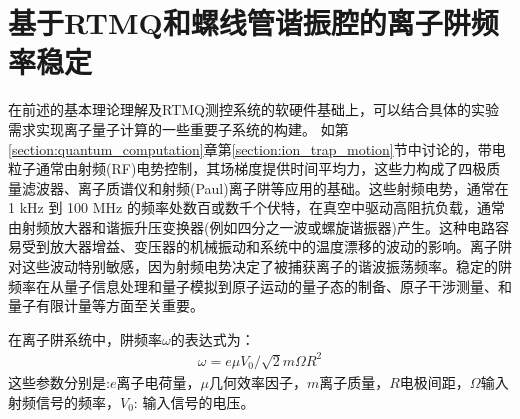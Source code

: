 \section[基于RTMQ和螺线管谐振腔的离子阱频率稳定]{基于RTMQ和螺线管谐振腔的离子阱频率稳定\label{section:trap_frequency_stablization}}

在前述的基本理论理解及RTMQ测控系统的软硬件基础上，可以结合具体的实验需求实现离子量子计算的一些重要子系统的构建。
如第\ref{section:quantum_computation}章第\ref{section:ion_trap_motion}节中讨论的，带电粒子通常由射频(RF)电势控制，其场梯度提供时间平均力，这些力构成了四极质量滤波器、离子质谱仪和射频(Paul)离子阱等应用的基础\cite[]{Dehmelt_1990, Paul_1990}。这些射频电势，通常在 1 kHz 到 100 MHz 的频率处数百或数千个伏特，在真空中驱动高阻抗负载，通常由射频放大器和谐振升压变换器(例如四分之一波或螺旋谐振器)产生\cite[]{Siverns_Simkins_Weidt_Hensinger_2012}。这种电路容易受到放大器增益、变压器的机械振动和系统中的温度漂移的波动的影响。离子阱对这些波动特别敏感，因为射频电势决定了被捕获离子的谐波振荡频率。稳定的阱频率在从量子信息处理\cite[]{Blatt_Wineland_2008, Monroe_Kim_2013}和量子模拟\cite[]{Richerme_Gong_Lee_Senko_Smith_Foss_Feig_Michalakis_Gorshkov_Monroe_2014, Jurcevic_Lanyon_Hauke_Hempel_Zoller_Blatt_Roos_2014}到原子运动的量子态的制备\cite[]{Leibfried_Blatt_Monroe_Wineland_2003}、原子干涉测量\cite[]{Johnson_Neyenhuis_Mizrahi_Wong_Campos_Monroe_2015}、和量子有限计量\cite[]{Chou_Hume_Koelemeij_Wineland_Rosenband_2010}等方面至关重要。


在离子阱系统中，阱频率$\omega$的表达式为：
\begin{align}
    \omega=e\mu V_0/\sqrt{2}m\Omega R^2 \label{eq:trap_frequency}
\end{align}
这些参数分别是:$e$离子电荷量，$\mu$几何效率因子，$m$离子质量，$R$电极间距，$\Omega$输入射频信号的频率，$V_0$: 输入信号的电压。


